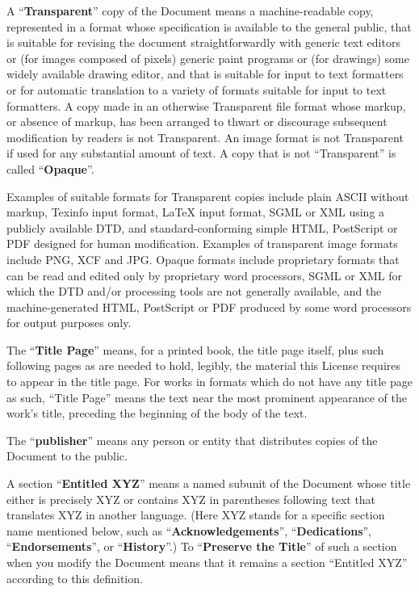 \begin{scriptsize}
\begin{multicols}{2}
    A ``\textbf{Transparent}'' copy of the Document means a machine-readable copy, represented in a format whose specification is available to the general public, that is suitable for revising the document straightforwardly with generic text editors or (for images composed of pixels) generic paint programs or (for drawings) some widely available drawing editor, and that is suitable for input to text formatters or for automatic translation to a variety of formats suitable for input to text formatters.  A copy made in an otherwise Transparent file format whose markup, or absence of markup, has been arranged to thwart or discourage subsequent modification by readers is not Transparent. An image format is not Transparent if used for any substantial amount of text. A copy that is not ``Transparent'' is called ``\textbf{Opaque}''.

    Examples of suitable formats for Transparent copies include plain ASCII without markup, Texinfo input format, LaTeX input format, SGML or XML using a publicly available DTD, and standard-conforming simple HTML, PostScript or PDF designed for human modification. Examples of transparent image formats include PNG, XCF and JPG.  Opaque formats include proprietary formats that can be read and edited only by proprietary word processors, SGML or XML for which the DTD and/or processing tools are not generally available, and the machine-generated HTML, PostScript or PDF produced by some word processors for output purposes only.

    The ``\textbf{Title Page}'' means, for a printed book, the title page itself, plus such following pages as are needed to hold, legibly, the material this License requires to appear in the title page.  For works in formats which do not have any title page as such, ``Title Page'' means the text near the most prominent appearance of the work's title, preceding the beginning of the body of the text.

    The ``\textbf{publisher}'' means any person or entity that distributes copies of the Document to the public.

    A section ``\textbf{Entitled XYZ}'' means a named subunit of the Document whose title either is precisely XYZ or contains XYZ in parentheses following text that translates XYZ in another language.  (Here XYZ stands for a specific section name mentioned below, such as ``\textbf{Acknowledgements}'', ``\textbf{Dedications}'', ``\textbf{Endorsements}'', or ``\textbf{History}''.) To ``\textbf{Preserve the Title}'' of such a section when you modify the Document means that it remains a section ``Entitled XYZ'' according to this definition.


\end{multicols}
\end{scriptsize}
